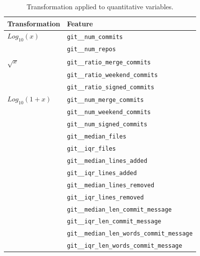 \documentclass[a4paper, 12pt]{book}
\begin{document}
\begin{table}[htb]  %
 \renewcommand{\arraystretch}{1.2}  %
 \begin{center}
  \begin{tabular}{ l l }
    \toprule    %
    \textbf{Transformation} & \textbf{Feature}\\
    \midrule
    $Log_{10}(x)$       & \texttt{git\_\_num\_commits} \\
                        & \texttt{git\_\_num\_repos} \\
    \addlinespace
    $\sqrt{x}$          & \texttt{git\_\_ratio\_merge\_commits} \\
                        & \texttt{git\_\_ratio\_weekend\_commits} \\
                        & \texttt{git\_\_ratio\_signed\_commits} \\
    \addlinespace
    $Log_{10}(1 + x)$   & \texttt{git\_\_num\_merge\_commits} \\
                        & \texttt{git\_\_num\_weekend\_commits} \\
                        & \texttt{git\_\_num\_signed\_commits} \\
                        & \texttt{git\_\_median\_files} \\
                        & \texttt{git\_\_iqr\_files} \\
                        & \texttt{git\_\_median\_lines\_added} \\
                        & \texttt{git\_\_iqr\_lines\_added} \\
                        & \texttt{git\_\_median\_lines\_removed} \\
                        & \texttt{git\_\_iqr\_lines\_removed} \\
                        & \texttt{git\_\_median\_len\_commit\_message} \\
                        & \texttt{git\_\_iqr\_len\_commit\_message} \\
                        & \texttt{git\_\_median\_len\_words\_commit\_message} \\
                        & \texttt{git\_\_iqr\_len\_words\_commit\_message} \\
    \bottomrule     %
  \end{tabular}
  \caption{Transformation applied to quantitative variables.}
  \label{table:transformation-quantitative}
 \end{center}
\end{table}
\end{document}
